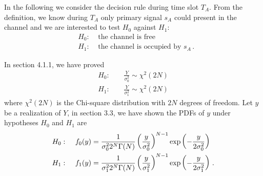 In the following we consider the decision rule during time slot $T_A$. From the definition, we know during $T_A$ only primary signal $s_A$ could present in the channel and we are interested to test $H_0$ against $H_1$:
\begin{equation}
  \begin{split}
&H_0:\;\;\;\;\text{the channel is free}\\
&H_1:\;\;\;\;\text{the channel is occupied by $s_A$}\,.
\end{split}
\end{equation}

In section 4.1.1, we have proved 
\begin{equation}
\begin{split}
  H_0:\;\;\;\;&\frac{Y}{\sigma_0^2} \sim \chi^2(2N)\\
H_1:\;\;\;\;&\frac{Y}{\sigma_1^2} \sim \chi^2(2N)
\end{split}
\end{equation}
where $\chi^2(2N)$ is the Chi-square distribution with $2N$ degrees of freedom. Let $y$ be a realization of $Y$, in section 3.3, we have shown the PDFs of $y$ under hypotheses $H_0$ and $H_1$ are 
\begin{equation}
  \begin{split}
    H_0:\;\;\;\;\;&f_0(y) = \CHISQUY[\sigma_0^2]\\
    H_1:\;\;\;\;\;&f_{1}(y) = \CHISQUY[\sigma_1^2]\,.
  \end{split}
  \label{20150621a8}
\end{equation}

